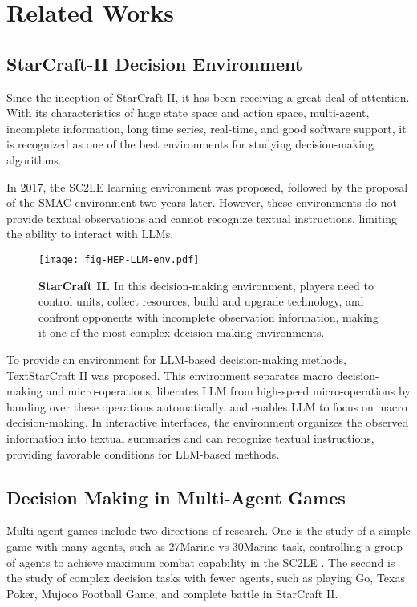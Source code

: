 \section{Related Works}
\subsection{StarCraft-II Decision Environment}
Since the inception of StarCraft II, it has been receiving a great deal of
attention. With its characteristics of huge state space and action space, multi-agent, incomplete information, long time series, real-time, and good software support, it is recognized as one of the best environments for studying decision-making algorithms. 

In 2017, the SC2LE learning environment was proposed, followed by the proposal of the SMAC environment\cite{SMAC} two years later. However, these environments do not provide textual observations and cannot recognize textual instructions, limiting the ability to interact with LLMs.

\begin{figure}
\centerline{\texttt{[image: fig-HEP-LLM-env.pdf]}}
\caption{\textbf{StarCraft II.} In this decision-making environment, players need to control units, collect resources, build and upgrade technology, and confront opponents with incomplete observation information, making it one of the most complex decision-making environments.} 
\end{figure}

To provide an environment for LLM-based decision-making methods, TextStarCraft II was proposed. This environment separates macro decision-making and micro-operations, liberates LLM from high-speed micro-operations by handing over these operations automatically, and enables LLM to focus on macro decision-making. In interactive interfaces, the environment organizes the observed information into textual summaries and can recognize textual instructions, providing favorable conditions for LLM-based methods.

\subsection{Decision Making in Multi-Agent Games}

Multi-agent games include two directions of research. One is the study of a simple game with many agents, such as 27Marine-vs-30Marine task, controlling a group of agents to achieve maximum combat capability in the SC2LE . The second is the study of complex decision tasks with fewer agents, such as playing Go\cite{AlphaGo}, Texas Poker\cite{Alphaholdem}, Mujoco Football Game\cite{MujocoFootball}, and complete battle in StarCraft II. 


